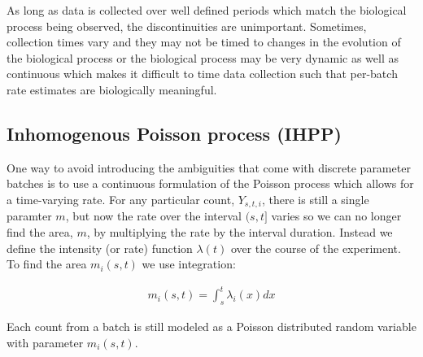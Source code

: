 As long as data is collected over well defined periods which match the
biological process being observed, the discontinuities are unimportant.
Sometimes, collection times vary and they may not be timed to changes in
the evolution of the biological process or the biological process may
be very dynamic as well as continuous which makes it difficult to time
data collection such that per-batch rate estimates are biologically
meaningful.  


\subsection{Inhomogenous Poisson process (IHPP)}

One way to avoid introducing the ambiguities that come with discrete
parameter batches is to use a continuous formulation of the Poisson
process which allows for a time-varying rate.  For any particular
count, $Y_{s,t,i}$, there is still a single paramter $m$, but now the
rate over the interval $(s,t]$ varies so we can no longer find the area, 
$m$, by multiplying the rate by the interval duration.  Instead we
define the intensity (or rate) function $\lambda(t)$ over the course
of the experiment.  To find the area $m_i(s,t)$ we use integration:

\begin{align}
	m_i(s,t) = \int_s^t \lambda_i(x)dx
\end{align}

Each count from a batch is still modeled as a Poisson distributed
random variable with parameter $m_i(s,t)$.  

